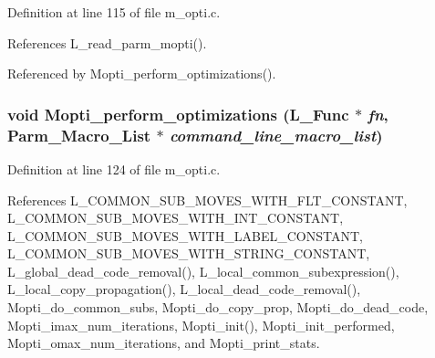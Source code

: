 Definition at line 115 of file m\_\-opti.c.

References L\_\-read\_\-parm\_\-mopti().

Referenced by Mopti\_\-perform\_\-optimizations().
\subsubsection{\setlength{\rightskip}{0pt plus 5cm}void Mopti\_\-perform\_\-optimizations (L\_\-Func $\ast$ {\em fn}, Parm\_\-Macro\_\-List $\ast$ {\em command\_\-line\_\-macro\_\-list})}\label{m__opti_8h_9f5474cb2be3b277262066b02350942a}




Definition at line 124 of file m\_\-opti.c.

References L\_\-COMMON\_\-SUB\_\-MOVES\_\-WITH\_\-FLT\_\-CONSTANT, L\_\-COMMON\_\-SUB\_\-MOVES\_\-WITH\_\-INT\_\-CONSTANT, L\_\-COMMON\_\-SUB\_\-MOVES\_\-WITH\_\-LABEL\_\-CONSTANT, L\_\-COMMON\_\-SUB\_\-MOVES\_\-WITH\_\-STRING\_\-CONSTANT, L\_\-global\_\-dead\_\-code\_\-removal(), L\_\-local\_\-common\_\-subexpression(), L\_\-local\_\-copy\_\-propagation(), L\_\-local\_\-dead\_\-code\_\-removal(), Mopti\_\-do\_\-common\_\-subs, Mopti\_\-do\_\-copy\_\-prop, Mopti\_\-do\_\-dead\_\-code, Mopti\_\-imax\_\-num\_\-iterations, Mopti\_\-init(), Mopti\_\-init\_\-performed, Mopti\_\-omax\_\-num\_\-iterations, and Mopti\_\-print\_\-stats.